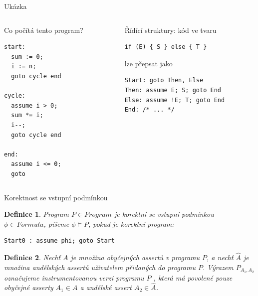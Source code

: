 \documentclass[11pt]{beamer}
\newtheorem{dfn}{Definice}
\begin{document}
\begin{frame}[fragile]{Ukázka}
\begin{columns}

\begin{column}{0.5\textwidth}
Co počítá tento program?
\begin{lstlisting}
start:
  sum := 0;
  i := n; 
  goto cycle end
    
cycle:
  assume i > 0;
  sum *= i;
  i--;
  goto cycle end
     
end:
  assume i <= 0;
  goto
\end{lstlisting}
\end{column}

\begin{column}{0.5\textwidth}
\pause
Řídící struktury: kód ve tvaru
\begin{lstlisting}
if (E) { S } else { T }
\end{lstlisting}
lze přepsat jako
\begin{lstlisting}
Start: goto Then, Else
Then: assume E; S; goto End
Else: assume !E; T; goto End
End: /* ... */
\end{lstlisting}
\end{column}
\end{columns}
\end{frame}

\begin{frame}[fragile]{Korektnost se vstupní podmínkou}
\begin{dfn}
Program $P \in \textit{Program}$ je korektní se vstupní podmínkou $\phi \in \textit{Formula}$,
píšeme $\phi \vDash P$, pokud je korektní program:
\begin{lstlisting}
Start0 : assume phi; goto Start
\end{lstlisting}
\end{dfn}

\pause

\begin{dfn}
Nechť $A$ je množina obyčejných assertů v programu $P$,
a nechť $\hat{A}$ je množina andělských assertů 
uživatelem přidaných do programu $P$. Výrazem $P_{A_1, A_2}$
označujeme instrumentovanou verzi programu $P$ ,
která má povolené pouze obyčejné asserty $A_1 \in A$
a andělské assert $A_2 \in \hat{A}$.
\end{dfn}

\end{frame}
\end{document}
